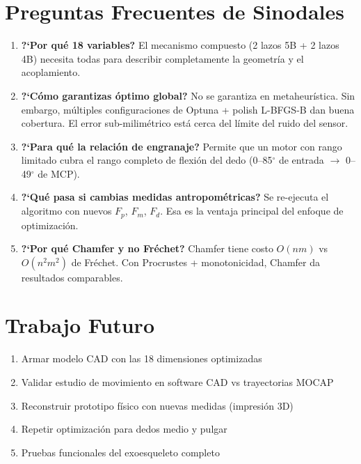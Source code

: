\documentclass[11pt,letterpaper]{article}
\begin{document}
\section{Preguntas Frecuentes de Sinodales}

\begin{enumerate}
\item \textbf{?`Por qu\'e 18 variables?} El mecanismo compuesto (2 lazos 5B + 2 lazos 4B) necesita todas para describir completamente la geometr\'ia y el acoplamiento.
\item \textbf{?`C\'omo garantizas \'optimo global?} No se garantiza en metaheur\'istica. Sin embargo, m\'ultiples configuraciones de Optuna + polish L-BFGS-B dan buena cobertura. El error sub-milim\'etrico est\'a cerca del l\'imite del ruido del sensor.
\item \textbf{?`Para qu\'e la relaci\'on de engranaje?} Permite que un motor con rango limitado cubra el rango completo de flexi\'on del dedo (0--85$^\circ$ de entrada $\rightarrow$ 0--49$^\circ$ de MCP).
\item \textbf{?`Qu\'e pasa si cambias medidas antropom\'etricas?} Se re-ejecuta el algoritmo con nuevos $F_p$, $F_m$, $F_d$. Esa es la ventaja principal del enfoque de optimizaci\'on.
\item \textbf{?`Por qu\'e Chamfer y no Fr\'echet?} Chamfer tiene costo $O(nm)$ vs $O(n^2m^2)$ de Fr\'echet. Con Procrustes + monotonicidad, Chamfer da resultados comparables.
\end{enumerate}

\section{Trabajo Futuro}
\begin{enumerate}
\item Armar modelo CAD con las 18 dimensiones optimizadas
\item Validar estudio de movimiento en software CAD vs trayectorias MOCAP
\item Reconstruir prototipo f\'isico con nuevas medidas (impresi\'on 3D)
\item Repetir optimizaci\'on para dedos medio y pulgar
\item Pruebas funcionales del exoesqueleto completo
\end{enumerate}
\end{document}
